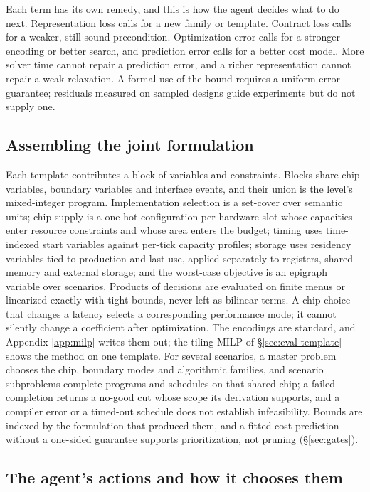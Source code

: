 \documentclass[11pt]{article}
\begin{document}
Each term has its own remedy, and this is how the agent decides what to do next. Representation loss calls for a new family or template. Contract loss calls for a weaker, still sound precondition. Optimization error calls for a stronger encoding or better search, and prediction error calls for a better cost model. More solver time cannot repair a prediction error, and a richer representation cannot repair a weak relaxation. A formal use of the bound requires a uniform error guarantee; residuals measured on sampled designs guide experiments but do not supply one.

\subsection{Assembling the joint formulation}\label{sec:assembly}

Each template contributes a block of variables and constraints. Blocks share chip variables, boundary variables and interface events, and their union is the level's mixed-integer program. Implementation selection is a set-cover over semantic units; chip supply is a one-hot configuration per hardware slot whose capacities enter resource constraints and whose area enters the budget; timing uses time-indexed start variables against per-tick capacity profiles; storage uses residency variables tied to production and last use, applied separately to registers, shared memory and external storage; and the worst-case objective is an epigraph variable over scenarios. Products of decisions are evaluated on finite menus or linearized exactly with tight bounds, never left as bilinear terms. A chip choice that changes a latency selects a corresponding performance mode; it cannot silently change a coefficient after optimization. The encodings are standard, and Appendix \ref{app:milp} writes them out; the tiling MILP of §\ref{sec:eval-template} shows the method on one template. For several scenarios, a master problem chooses the chip, boundary modes and algorithmic families, and scenario subproblems complete programs and schedules on that shared chip; a failed completion returns a no-good cut whose scope its derivation supports, and a compiler error or a timed-out schedule does not establish infeasibility. Bounds are indexed by the formulation that produced them, and a fitted cost prediction without a one-sided guarantee supports prioritization, not pruning (§\ref{sec:gates}).

\subsection{The agent's actions and how it chooses them}\label{sec:diagnosis}
\end{document}
